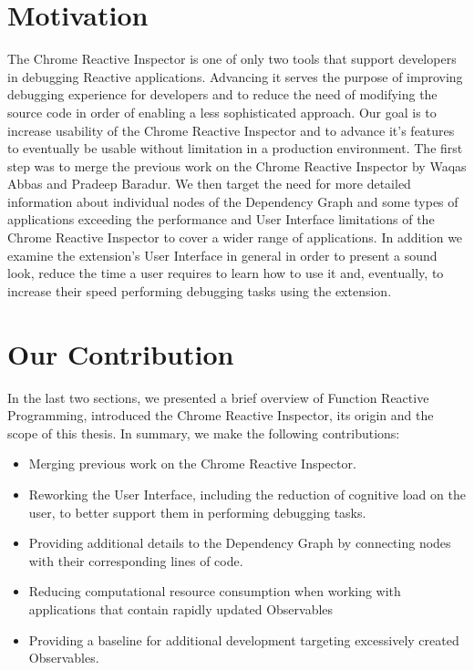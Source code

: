 \section{Motivation}
The Chrome Reactive Inspector is one of only two tools that support developers in debugging Reactive applications. Advancing it serves the purpose of improving debugging experience for developers and to reduce the need of modifying the source code in order of enabling a less sophisticated approach. Our goal is to increase usability of the Chrome Reactive Inspector and to advance it's features to eventually be usable without limitation in a production environment. The first step was to merge the previous work on the Chrome Reactive Inspector by Waqas Abbas and Pradeep Baradur. We then target the need for more detailed information about individual nodes of the Dependency Graph and some types of applications exceeding the performance and User Interface limitations of the Chrome Reactive Inspector to cover a wider range of applications. In addition we examine the extension's User Interface in general in order to present a sound look, reduce the time a user requires to learn how to use it and, eventually, to increase their speed performing debugging tasks using the extension.


\section{Our Contribution}

In the last two sections, we presented a brief overview of Function Reactive Programming, introduced the Chrome Reactive Inspector, its origin and the scope of this thesis.
In summary, we make the following contributions:

\begin{itemize}
	\item Merging previous work on the Chrome Reactive Inspector.
	\item Reworking the User Interface, including the reduction of cognitive load on the user, to better support them in performing debugging tasks.
	\item Providing additional details to the Dependency Graph by connecting nodes with their corresponding lines of code.
	\item Reducing computational resource consumption when working with applications that contain rapidly updated Observables
	\item Providing a baseline for additional development targeting excessively created Observables.
\end{itemize}


